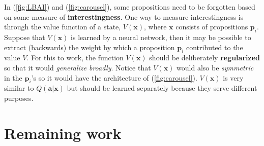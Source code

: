 \documentclass[orivec]{llncs}
\newcommand{\vect}[1]{\boldsymbol{#1}}
\begin{document}
In (\ref{fig:LBAI}) and (\ref{fig:carousel}), some propositions need to be forgotten based on some measure of \textbf{interestingness}.  One way to measure interestingness is through the value function of a state, $V(\vect{x})$, where $\vect{x}$ consists of propositions $\vect{p}_i$.  Suppose that $V(\vect{x})$ is learned by a neural network, then it may be possible to extract (backwards) the weight by which a proposition $\vect{p}_i$ contributed to the value $V$.  For this to work, the function $V(\vect{x})$ should be deliberately \textbf{regularized} so that it would \textit{generalize broadly}.  Notice that $V(\vect{x})$ would also be \textit{symmetric} in the $\vect{p}_i$'s  so it would have the architecture of (\ref{fig:carousel}).  $V(\vect{x})$ is very similar to $Q(\vect{a}|\vect{x})$ but should be learned separately because they serve different purposes.




\section{Remaining work}

\end{document}
